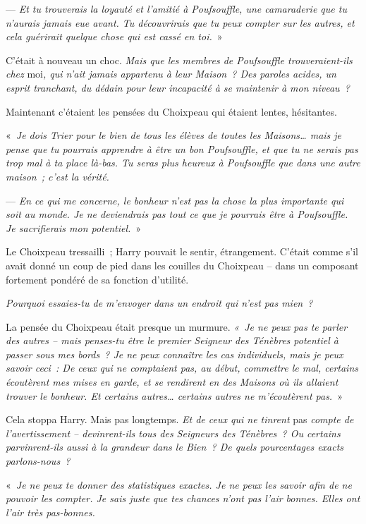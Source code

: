 --- \emph{Et tu trouverais la loyauté et l'amitié à Poufsouffle, une camaraderie que tu n'aurais jamais eue avant. Tu découvrirais que tu peux compter sur les autres, et cela guérirait quelque chose qui est cassé en toi.}~»

C'était à nouveau un choc. \emph{Mais que les membres de Poufsouffle trouveraient-ils chez} moi\emph{, qui n'ait jamais appartenu à leur Maison~? Des paroles acides, un esprit tranchant, du dédain pour leur incapacité à se maintenir à mon niveau~?}

Maintenant c'étaient les pensées du Choixpeau qui étaient lentes, hésitantes.

«~\emph{Je dois Trier pour le bien de tous les élèves de toutes les Maisons… mais je pense que tu pourrais apprendre à être un bon Poufsouffle, et que tu ne serais pas trop mal à ta place là-bas. Tu seras plus heureux à Poufsouffle que dans une autre maison~; c'est la vérité.}

--- \emph{En ce qui me concerne, le bonheur n'est pas la chose la plus importante qui soit au monde. Je ne deviendrais pas tout ce que je pourrais être à Poufsouffle. Je sacrifierais mon potentiel.}~»

Le Choixpeau tressailli~; Harry pouvait le sentir, étrangement. C'était comme s'il avait donné un coup de pied dans les couilles du Choixpeau -- dans un composant fortement pondéré de sa fonction d'utilité.

\emph{Pourquoi essaies-tu de m'envoyer dans un endroit qui n'est pas mien~?}

La pensée du Choixpeau était presque un murmure. \emph{«~Je ne peux pas te parler des autres -- mais penses-tu être le premier Seigneur des Ténèbres potentiel à passer sous mes bords~? Je ne peux connaître les cas individuels, mais je peux savoir ceci~: De ceux qui ne comptaient pas, au début, commettre le mal, certains écoutèrent mes mises en garde, et se rendirent en des Maisons où ils allaient trouver le bonheur. Et certains autres… certains autres ne m'écoutèrent pas.}~»

Cela stoppa Harry. Mais pas longtemps. \emph{Et de ceux qui ne tinrent} pas \emph{compte de l'avertissement -- devinrent-ils tous des Seigneurs des Ténèbres~? Ou certains parvinrent-ils aussi à la grandeur dans le Bien~? De quels pourcentages exacts parlons-nous~?}

«~\emph{Je ne peux te donner des statistiques exactes. Je ne peux les savoir afin de ne pouvoir les compter. Je sais juste que tes chances n'ont pas l'air bonnes. Elles ont l'air très pas-bonnes.}

